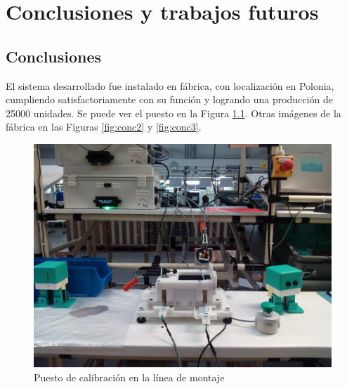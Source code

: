 
\chapter{Conclusiones y trabajos futuros} %

\label{Chapter4} %


\section{Conclusiones}

El sistema desarrollado fue instalado en fábrica, con localización en Polonia, cumpliendo satisfactoriamente con su función y logrando una producción de 25000 unidades. Se puede ver el puesto en la Figura \ref{fig:conc1}. Otras imágenes de la fábrica en las Figuras \ref{fig:conc2} y \ref{fig:conc3}.

\begin{figure}[h]
\centering
\includegraphics[width=135mm]{Figures/conc1.jpg}
\caption[Puesto de calibración en la línea de montaje]{Puesto de calibración en la línea de montaje}
\label{fig:conc1}
\end{figure}

